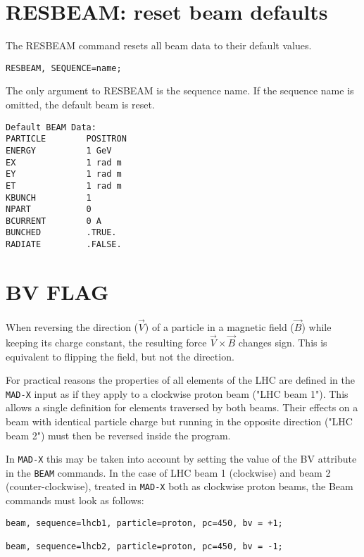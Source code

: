 %
\section{RESBEAM: reset beam defaults}
\label{sec:resbeam}

The RESBEAM command resets all beam data to their default values. 

\begin{verbatim}
RESBEAM, SEQUENCE=name;
\end{verbatim} 

The only argument to RESBEAM is the sequence name.
If the sequence name is omitted, the default beam is reset. 

\begin{verbatim}
Default BEAM Data:
PARTICLE        POSITRON
ENERGY          1 GeV
EX              1 rad m
EY              1 rad m
ET              1 rad m
KBUNCH          1
NPART           0
BCURRENT        0 A
BUNCHED         .TRUE.
RADIATE         .FALSE.
\end{verbatim}



%
\section{BV FLAG}
When reversing the direction ($\vec V$) of a particle in a magnetic field
($\vec B$) while keeping its charge constant, the resulting force $\vec
V \times \vec B$ changes sign. This is equivalent to flipping the field,
but not the direction.  

For practical reasons the properties of all elements of the LHC are
defined in the {\tt MAD-X} input as if they apply to a clockwise proton beam
("LHC beam 1"). This allows a single definition for elements traversed
by both beams. Their effects on a beam with identical particle charge
but running in the opposite direction ("LHC beam 2") must then be
reversed inside the program.  

In {\tt MAD-X} this may be taken into account by setting the value of
the BV attribute in the {\tt BEAM} commands. In the case of LHC beam 1
(clockwise) and beam 2 (counter-clockwise), treated in {\tt MAD-X} both
as clockwise proton beams, the Beam commands must look as follows:  

\begin{verbatim}
beam, sequence=lhcb1, particle=proton, pc=450, bv = +1;

beam, sequence=lhcb2, particle=proton, pc=450, bv = -1;
\end{verbatim}



